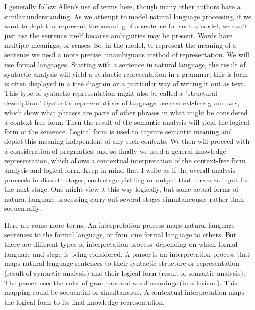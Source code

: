 I generally follow Allen's use of terms here, though many other authors have a similar understanding. As we attempt to model natural language processing, if we want to depict or represent the meaning of a sentence for such a model, we can't just use the sentence itself because ambiguities may be present. Words have multiple meanings, or senses. So, in the model, to represent the meaning of a sentence we need a more precise, unambiguous method of representation. We will use formal languages. Starting with a sentence in natural language, the result of syntactic analysis will yield a syntactic representation in a grammar; this is form is often displayed in a tree diagram or a particular way of writing it out as text. This type of syntactic representation might also be called a "structural description." Syntactic representations of language use context-free grammars, which show what phrases are parts of other phrases in what might be considered a context-free form. Then the result of the semantic analysis will yield the logical form of the sentence. Logical form is used to capture semantic meaning and depict this meaning independent of any such contexts. We then will proceed with a consideration of pragmatics, and so finally we need a general knowledge representation, which allows a contextual interpretation of the context-free form analysis and logical form. Keep in mind that I write as if the overall analysis proceeds in discrete stages, each stage yielding an output that serves as input for the next stage. One might view it this way logically, but some actual forms of natural language processing carry out several stages simultaneously rather than sequentially.

Here are some more terms. An interpretation process maps natural language sentences to the formal language, or from one formal language to others. But there are different types of interpretation process, depending on which formal language and stage is being considered. A parser is an interpretation process that maps natural language sentences to their syntactic structure or representation (result of syntactic analysis) and their logical form (result of semantic analysis). The parser uses the rules of grammar and word meanings (in a lexicon). This mapping could be sequential or simultaneous. A contextual interpretation maps the logical form to its final knowledge representation.

